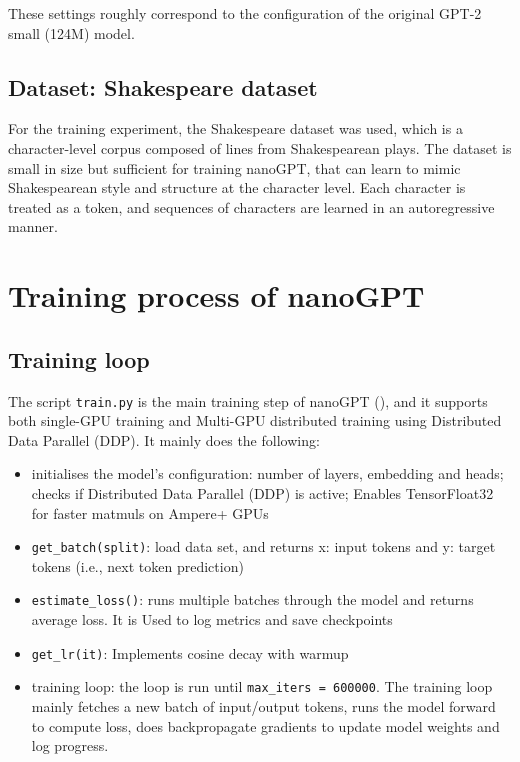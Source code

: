 \documentclass{article} %
\begin{document}
These settings roughly correspond to the configuration of the original GPT-2 small (124M) model.

\subsection{Dataset: Shakespeare dataset}
For the training experiment, the Shakespeare dataset was used, which is a character-level corpus composed of lines from Shakespearean plays. The dataset is small in size but sufficient for training nanoGPT, that can learn to mimic Shakespearean style and structure at the character level. Each character is treated as a token, and sequences of characters are learned in an autoregressive manner.


\section{Training process of nanoGPT}

\subsection{Training loop}
The script \texttt{train.py} is the main training step of nanoGPT (\cite{nanoGPT}), and it supports both single-GPU training and Multi-GPU distributed training using Distributed Data Parallel (DDP). It mainly does the following:
\begin{itemize}
    \item initialises the model's configuration: number of layers, embedding and heads; checks if Distributed Data Parallel (DDP) is active; Enables TensorFloat32 for faster matmuls on Ampere+ GPUs
    \item \texttt{get\_batch(split)}: load data set, and returns x: input tokens and y: target tokens (i.e., next token prediction)
    \item \texttt{estimate\_loss()}: runs multiple batches through the model and returns average loss. It is Used to log metrics and save checkpoints
    \item \texttt{get\_lr(it)}: Implements cosine decay with warmup
    \item training loop: the loop is run until \texttt{max\_iters = 600000}. The training loop mainly fetches a new batch of input/output tokens, runs the model forward to compute loss, does backpropagate gradients to update model weights and log progress.

 \end{itemize}
\end{document}
